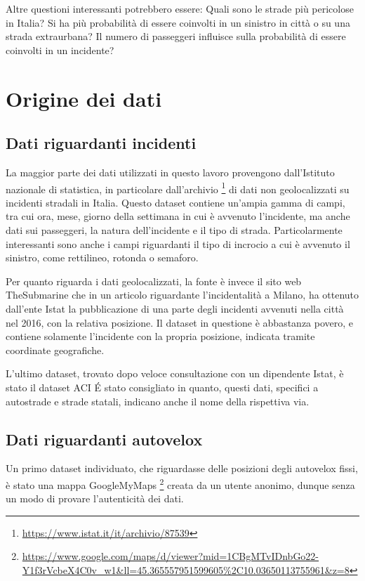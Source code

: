 \documentclass[a4paper]{report}
\begin{document}
Altre questioni interessanti potrebbero essere: 
Quali sono le strade più pericolose in Italia? 
Si ha più probabilità di essere coinvolti in un sinistro in città o su una strada extraurbana? 
Il numero di passeggeri influisce sulla probabilità di essere coinvolti in un incidente?

\chapter{Origine dei dati}

\section{Dati riguardanti incidenti}
La maggior parte dei dati utilizzati in questo lavoro provengono 
dall'Istituto nazionale di statistica, in particolare dall'archivio
\footnote{\url{https://www.istat.it/it/archivio/87539}}
di dati non geolocalizzati su incidenti stradali in Italia.
Questo dataset contiene un'ampia gamma di campi, tra cui ora, 
mese, giorno della settimana in cui è avvenuto l'incidente, 
ma anche dati sui passeggeri, la natura dell'incidente e il tipo di strada. 
Particolarmente interessanti sono anche i campi riguardanti il tipo di incrocio a cui è 
avvenuto il sinistro, come rettilineo, rotonda o semaforo.

Per quanto riguarda i dati geolocalizzati, 
la fonte è invece il sito web TheSubmarine \cite{SUBMARINE:1}
che in un articolo riguardante l'incidentalità a Milano, 
ha ottenuto dall'ente Istat la pubblicazione di una parte degli 
incidenti avvenuti nella città nel 2016, con la relativa posizione.
Il dataset in questione è abbastanza povero, e contiene solamente l'incidente con la 
propria posizione, indicata tramite coordinate geografiche.

L'ultimo dataset, trovato dopo veloce consultazione con un dipendente Istat, 
è stato il dataset ACI \cite{ACI:1}
\'E stato consigliato in quanto, questi dati, specifici a autostrade e strade statali, 
indicano anche il nome della rispettiva via.

\section{Dati riguardanti autovelox}
Un primo dataset individuato, che riguardasse delle posizioni degli autovelox fissi, 
è stato una mappa GoogleMyMaps
\footnote{\url{https://www.google.com/maps/d/viewer?mid=1CBgMTvIDnbGo22-Y1f3rVcbeX4C0v_w1&ll=45.365557951599605\%2C10.03650113755961&z=8}} 
creata da un utente anonimo, dunque senza un modo di provare l'autenticità dei dati.
\end{document}

